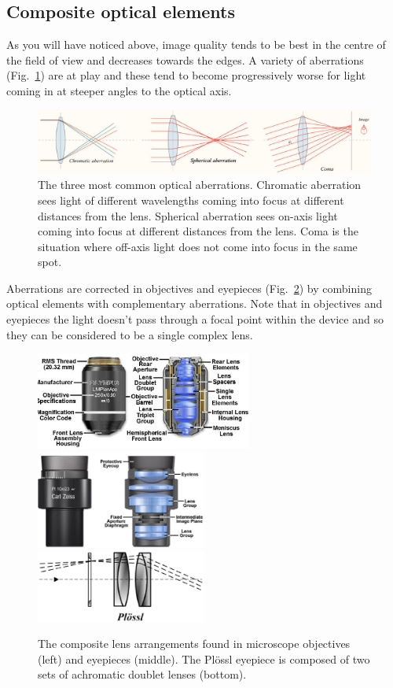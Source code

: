 \documentclass[a4paper]{report}
\begin{document}
\clearpage



\subsection{Composite optical elements}
As you will have noticed above, image quality tends to be best in the centre of the field of view and decreases towards the edges. 
A variety of aberrations (Fig.~\ref{fig:aberrations}) are at play and these tend to become progressively worse for light coming in at steeper angles to the optical axis.

\begin{figure}[h]
\center
\includegraphics[width=6in]{aberrations.eps}
\caption{The three most common optical aberrations. 
Chromatic aberration sees light of different wavelengths coming into focus at different distances from the lens.
Spherical aberration sees on-axis light coming into focus at different distances from the lens. 
Coma is the situation where off-axis light does not come into focus in the same spot. }
\label{fig:aberrations}
\end{figure}

Aberrations are corrected in objectives and eyepieces (Fig.~\ref{fig:composite}) by combining optical elements with complementary aberrations. 
Note that in objectives and eyepieces the light doesn't pass through a focal point within the device and so they can be considered to be a single complex lens.

\begin{figure}[h]
\center
\includegraphics[width=2.8in]{objectivesfigure1.eps}
\includegraphics[width=2.2in]{eyepieces5.eps}
\includegraphics[width=2.2in]{Plossl.eps}
\caption{The composite lens arrangements found in microscope
  objectives (left) and eyepieces (middle).
  The Pl\"{o}ssl eyepiece is composed of two sets of achromatic doublet lenses (bottom).}
\label{fig:composite}
\end{figure}
\end{document}
